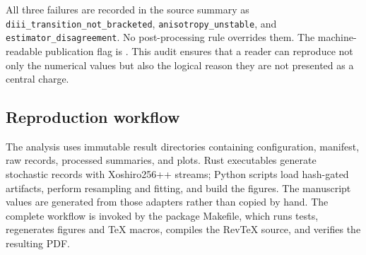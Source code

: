 \documentclass[aps,prb,reprint,superscriptaddress,longbibliography,floatfix]{revtex4-2}
\begin{document}
All three failures are recorded in the source summary as
\texttt{diii\_transition\_not\_bracketed},
\texttt{anisotropy\_unstable}, and
\texttt{estimator\_disagreement}.  No post-processing rule overrides them.
The machine-readable publication flag is \LearningPublished.  This audit
ensures that a reader can reproduce not only the numerical values but also the
logical reason they are not presented as a central charge.

\subsection{Reproduction workflow}

The analysis uses immutable result directories containing configuration,
manifest, raw records, processed summaries, and plots.  Rust executables
generate stochastic records with Xoshiro256++ streams; Python scripts load
hash-gated artifacts, perform resampling and fitting, and build the figures.
The manuscript values are generated from those adapters rather than copied by
hand.  The complete workflow is invoked by the package Makefile, which runs
tests, regenerates figures and TeX macros, compiles the RevTeX source, and
verifies the resulting PDF.


\end{document}

